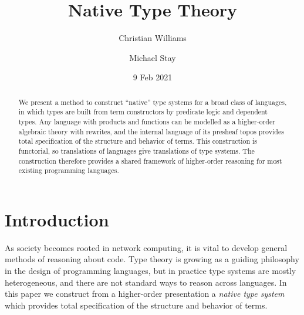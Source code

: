 \documentclass[12pt]{article}
\theoremstyle{definition}
\begin{document}
\title{Native Type Theory}
\date{9 Feb 2021}

\author{
{Christian Williams}
\and
{Michael Stay}}


\maketitle

\begin{abstract}
    We present a method to construct ``native'' type systems for a broad class of languages, in which types are built from term constructors by predicate logic and dependent types. Any language with products and functions can be modelled as a higher-order algebraic theory with rewrites, and the internal language of its presheaf topos provides total specification of the structure and behavior of terms. This construction is functorial, so translations of languages give translations of type systems.  The construction therefore provides a shared framework of higher-order reasoning for most existing programming languages.
\end{abstract}

\section{Introduction}
\label{sec:intro}


As society becomes rooted in network computing, it is vital to develop general methods of reasoning about code. Type theory is growing as a guiding philosophy in the design of programming languages, but in practice type systems are mostly heterogeneous, and there are not standard ways to reason across languages. In this paper we construct from a higher-order presentation a \textit{native type system} which provides total specification of the structure and behavior of terms.

\end{document}
